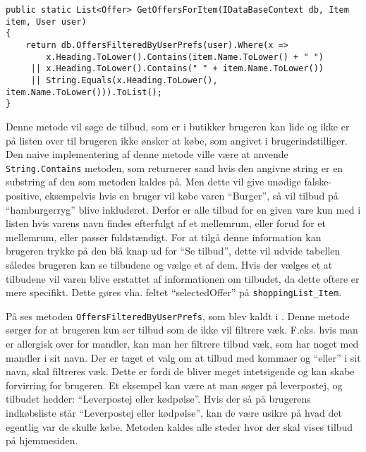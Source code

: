 \begin{lstlisting}[caption="Metoden ``GetOffersForItem'' finder relevante tilbud og returner dem som en liste", label=getoffersforitem]
public static List<Offer> GetOffersForItem(IDataBaseContext db, Item item, User user)
{
    return db.OffersFilteredByUserPrefs(user).Where(x => 
     	x.Heading.ToLower().Contains(item.Name.ToLower() + " ") 
     || x.Heading.ToLower().Contains(" " + item.Name.ToLower()) 
     || String.Equals(x.Heading.ToLower(), item.Name.ToLower())).ToList();
}
\end{lstlisting}

Denne metode vil søge de tilbud, som er i butikker brugeren kan lide og ikke er på listen over til brugeren ikke ønsker at købe, som angivet i brugerindstilliger.
Den naive implementering af denne metode ville være at anvende \texttt{String.Contains} metoden, som returnerer sand hvis den angivne string er en substring af den som metoden kaldes på. 
Men dette vil give unødige falske-positive, eksempelvis hvis en bruger vil købe varen ``Burger'', så vil tilbud på ``hamburgerryg'' blive inkluderet.
Derfor er alle tilbud for en given vare kun med i listen hvis varens navn findes efterfulgt af et mellemrum, eller forud for et mellemrum, eller passer fuldstændigt.
For at tilgå denne information kan brugeren trykke på den blå knap ud for  ``Se tilbud'', dette vil udvide tabellen således brugeren kan se tilbudene og vælge et af dem.
Hvis der vælges et at tilbudene vil varen blive erstattet af informationen om tilbudet, da dette oftere er mere specifikt.
Dette gøres vha. feltet ``selectedOffer'' på \texttt{shoppingList\_Item}.

På  ses metoden \texttt{OffersFilteredByUserPrefs}, som blev kaldt i . Denne metode sørger for at brugeren kun ser tilbud som de ikke vil filtrere væk. F.eks. hvis man er allergisk over for mandler, kan man her filtrere tilbud væk, som har noget med mandler i sit navn. Der er taget et valg om at tilbud med kommaer og ``eller'' i sit navn, skal filtreres væk. Dette er fordi de bliver meget intetsigende og kan skabe forvirring for brugeren. Et eksempel kan være at man søger på leverpostej, og tilbudet hedder: ``Leverpostej eller kødpølse''. Hvis der så på brugerens indkøbsliste står ``Leverpostej eller kødpølse'', kan de være usikre på hvad det egentlig var de skulle købe. Metoden kaldes alle steder hvor der skal vises tilbud på hjemmesiden.


